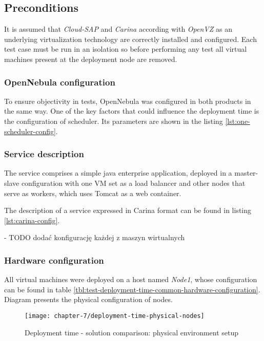 \subsection*{Preconditions}
It is assumed that \emph{Cloud-SAP} and \emph{Carina} according with \emph{OpenVZ} as an underlying virtualization technology are correctly installed and configured.
Each test case must be run in an isolation so before performing any test all virtual machines present at the deployment node are removed.
\subsubsection{OpenNebula configuration}
To ensure objectivity in tests, OpenNebula was configured in both products in the same way. One of the key factors that could influence the deployment time is the configuration of scheduler. Its parameters are shown in the listing \ref{lst:one-scheduler-config}.

\subsubsection{Service description}
The service comprises a simple java enterprise application, deployed in a master-slave configuration with one VM set as a load balancer and other nodes that serve as workers, which uses Tomcat as a web container.

The description of a service expressed in Carina format can be found in listing \ref{lst:carina-config}.

- TODO dodać konfigurację każdej z maszyn wirtualnych 

\subsubsection{Hardware configuration}

All virtual machines were deployed on a host named \emph{Node1}, whose configuration can be found in table \ref{tbl:test-deployment-time-common-hardware-configuration}. Diagram presents the physical configuration of nodes.

\begin{figure}[!ht]
  \begin{center}
    \texttt{[image: chapter-7/deployment-time-physical-nodes]}
  \end{center}
  \caption{Deployment time - solution comparison: physical environment setup}
  \label{eval:deployment-time-physical-nodes}
\end{figure}


